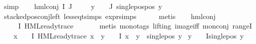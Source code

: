 \begin{isabellebody}
\ simp\isanewline
{}\isamarkupfalse%
\isanewline
\ \ \isamarkupfalse%
\ {\isacharparenleft}{\kern0pt}hml{\isacharunderscore}{\kern0pt}conj\ I\ J\ {\isasymPhi}{\isacharparenright}{\kern0pt}\isanewline
\ \ \isamarkupfalse%
\ {\isachardoublequoteopen}{\isacharparenleft}{\kern0pt}{\isasymforall}y\ {\isasymin}\ {\isacharparenleft}{\kern0pt}{\isasymPhi}\ {\isacharbackquote}{\kern0pt}\ J{\isacharparenright}{\kern0pt}{\isachardot}{\kern0pt}\ single{\isacharunderscore}{\kern0pt}pos{\isacharunderscore}{\kern0pt}pos\ y{\isacharparenright}{\kern0pt}{\isachardoublequoteclose}\isanewline
\ \ \ \ \isamarkupfalse%
\ stacked{\isacharunderscore}{\kern0pt}pos{\isacharunderscore}{\kern0pt}conj{\isacharunderscore}{\kern0pt}left\ less{\isacharunderscore}{\kern0pt}eq{\isacharunderscore}{\kern0pt}t{\isachardot}{\kern0pt}simps\ expr{\isachardot}{\kern0pt}simps\isanewline
\ \ \ \ \isamarkupfalse%
\ metis\isanewline
\ \ \isamarkupfalse%
\ hml{\isacharunderscore}{\kern0pt}conj\ \isamarkupfalse%
\ {\isachardoublequoteopen}{\isasymforall}{\isasymphi}\ {\isasymin}\ {\isacharparenleft}{\kern0pt}{\isasymPhi}\ {\isacharbackquote}{\kern0pt}\ I{\isacharparenright}{\kern0pt}{\isachardot}{\kern0pt}\ HML{\isacharunderscore}{\kern0pt}ready{\isacharunderscore}{\kern0pt}trace\ {\isasymphi}{\isachardoublequoteclose}\isanewline
\ \ \ \ \isamarkupfalse%
\ {\isacharparenleft}{\kern0pt}metis\ {\isacharparenleft}{\kern0pt}mono{\isacharunderscore}{\kern0pt}tags{\isacharcomma}{\kern0pt}\ lifting{\isacharparenright}{\kern0pt}\ image{\isacharunderscore}{\kern0pt}iff\ mon{\isacharunderscore}{\kern0pt}conj{\isacharparenleft}{\kern0pt}{}{\isacharparenright}{\kern0pt}\ rangeI{\isacharparenright}{\kern0pt}\isanewline
\ \ \isamarkupfalse%
\ {\isachardoublequoteopen}{\isacharparenleft}{\kern0pt}{\isasymexists}x\ {\isasymin}\ {\isacharparenleft}{\kern0pt}{\isasymPhi}\ {\isacharbackquote}{\kern0pt}\ I{\isacharparenright}{\kern0pt}{\isachardot}{\kern0pt}\ HML{\isacharunderscore}{\kern0pt}ready{\isacharunderscore}{\kern0pt}trace\ x\ {\isasymand}\ {\isacharparenleft}{\kern0pt}{\isasymforall}y\ {\isasymin}\ {\isacharparenleft}{\kern0pt}{\isasymPhi}\ {\isacharbackquote}{\kern0pt}\ I{\isacharparenright}{\kern0pt}{\isachardot}{\kern0pt}\ x\ {\isasymnoteq}\ y\ {\isasymlongrightarrow}\ single{\isacharunderscore}{\kern0pt}pos\ y{\isacharparenright}{\kern0pt}{\isacharparenright}{\kern0pt}\isanewline
{\isasymor}\ {\isacharparenleft}{\kern0pt}{\isasymforall}y\ {\isasymin}\ {\isacharparenleft}{\kern0pt}{\isasymPhi}\ {\isacharbackquote}{\kern0pt}\ I{\isacharparenright}{\kern0pt}{\isachardot}{\kern0pt}single{\isacharunderscore}{\kern0pt}pos\ y{\isacharparenright}{\kern0pt}{\isachardoublequoteclose}\isanewline

\end{isabellebody}
